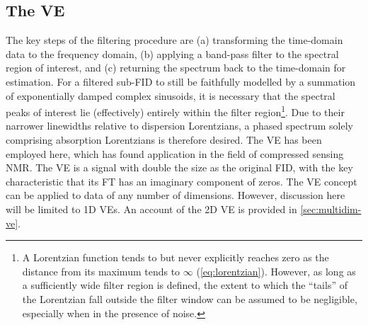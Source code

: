 \subsection{The \acl{VE}}
\label{subsec:ve}
The key steps of the filtering procedure are
(a) transforming the time-domain data to the frequency domain,
(b) applying a band-pass filter to the spectral region of interest, and
(c) returning the spectrum back to the time-domain for estimation.
For a filtered sub-\ac{FID} to still be faithfully modelled by a
summation of exponentially damped complex sinusoids, it is necessary that the
spectral peaks of interest lie (effectively) entirely within the filter
region\footnote{
    A Lorentzian function tends to but never explicitly reaches zero as the
    distance from its maximum tends to $\infty$ (\cref{eq:lorentzian}).
    However, as long as a sufficiently wide filter region is defined, the
    extent to which the ``tails'' of the Lorentzian fall outside the filter
    window can be assumed to be negligible, especially when in the presence of
    noise.
}.
Due to their narrower linewidths relative to dispersion Lorentzians, a phased
spectrum solely comprising absorption Lorentzians is therefore desired.
The \ac{VE} has been employed here, which has found application in the field of
compressed sensing NMR\cite{Mayzel2014,Golowicz2020,Luo2020}. The \ac{VE} is a
signal with double the size as the original \ac{FID}, with the key
characteristic that its \ac{FT} has an imaginary component of zeros. The
\ac{VE} concept can be applied to data of any number of dimensions. However,
discussion here will be limited to \ac{1D} \acp{VE}.
An account of the \ac{2D} \ac{VE} is provided in \cref{sec:multidim-ve}.

